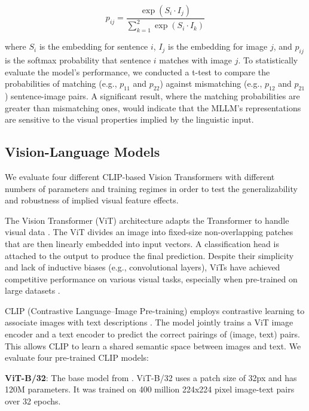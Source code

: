 \documentclass[10pt, a4paper]{article}
\begin{document}
\[ p_{ij} = \frac{\exp(S_i \cdot I_j)}{\sum_{k=1}^{2} \exp(S_i \cdot I_k)} \]

where \( S_i \) is the embedding for sentence \( i \), \( I_j \) is the embedding for image \( j \), and \( p_{ij} \) is the softmax probability that sentence \( i \) matches with image \( j \).
To statistically evaluate the model's performance, we conducted a t-test to compare the probabilities of matching (e.g., \( p_{11} \) and \( p_{22} \)) against mismatching (e.g., \( p_{12} \) and \( p_{21} \)) sentence-image pairs. A significant result, where the matching probabilities are greater than mismatching ones, would indicate that the MLLM's representations are sensitive to the visual properties implied by the linguistic input.

\subsection{Vision-Language Models}

We evaluate four different CLIP-based Vision Transformers with different numbers of parameters and training regimes in order to test the generalizability and robustness of implied visual feature effects.

The Vision Transformer (ViT) architecture adapts the Transformer to handle visual data \cite{dosovitskiyImageWorth16x162021}. The ViT divides an image into fixed-size non-overlapping patches that are then linearly embedded into input vectors.
A classification head is attached to the output to produce the final prediction. Despite their simplicity and lack of inductive biases (e.g., convolutional layers), ViTs have achieved competitive performance on various visual tasks, especially when pre-trained on large datasets \cite{dosovitskiyImageWorth16x162021, schuhmannLaion5bOpenLargescale2022}.

CLIP (Contrastive Language–Image Pre-training) employs contrastive learning to associate images with text descriptions \citep{radfordLearningTransferableVisual2021a}. The model jointly trains a ViT image encoder and a text encoder to predict the correct pairings of (image, text) pairs. This allows CLIP to learn a shared semantic space between images and text. We evaluate four pre-trained CLIP models:

\textbf{ViT-B/32}: The base model from \citep{radfordLearningTransferableVisual2021a}. ViT-B/32 uses a patch size of 32px and has 120M parameters. It was trained on 400 million 224x224 pixel image-text pairs over 32 epochs.
\end{document}
